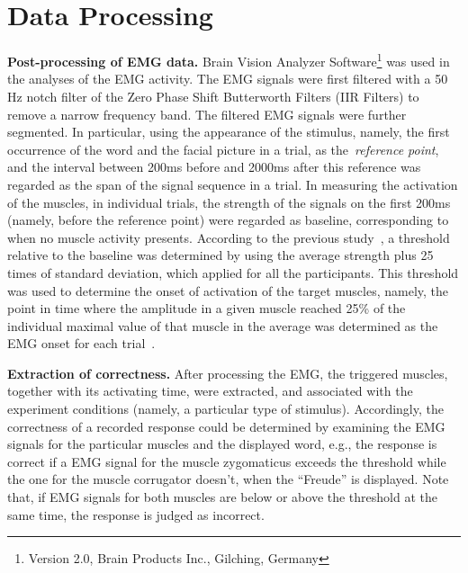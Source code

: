 \section{Data Processing}\label{sec.method.postprocessing}
\textbf{Post-processing of EMG data.}
Brain Vision Analyzer Software\footnote{Version 2.0, Brain Products Inc., Gilching, Germany} was used in the analyses of the EMG activity. 
The EMG signals were first filtered with a 50 Hz notch filter of the Zero Phase Shift Butterworth Filters (IIR Filters) to remove a narrow frequency band. 
The filtered EMG signals were further segmented. In particular, using the appearance of the 
stimulus, namely, the first occurrence of the word and the facial picture in a trial, as the~\textit{reference point}, and the interval between 200ms before and 2000ms after this reference was regarded as the span of the signal sequence in a trial. 
In measuring the activation of the muscles, 
in individual trials,
the strength of the signals on the first 200ms (namely, before the reference point) were regarded as baseline, corresponding to when no muscle activity presents.
According to the previous study~\citep{recio2014should}, a threshold relative to the baseline was determined by using the average strength plus 25 times of standard deviation,
which applied for all the participants. This threshold was used to determine the onset of activation of the target muscles, namely, the point in time where the amplitude in a given muscle reached 25\% of the individual maximal value of that muscle in the average was determined as the EMG onset for each trial~\citep{recio2014should}.


\textbf{Extraction of correctness.}
After processing the EMG, 
the triggered muscles, together with its activating time, were extracted, and associated
with the experiment conditions (namely, a particular type of stimulus).
Accordingly, 
the correctness of a recorded response 
could be determined by examining the EMG signals 
for the particular muscles and the displayed word, e.g., the response is correct if a EMG signal for the muscle zygomaticus exceeds the threshold while the one for the muscle corrugator doesn't, when the  ``Freude'' is displayed. 
Note that, 
if EMG signals for both muscles are below or above the threshold at the same time, the response is judged as incorrect.  



